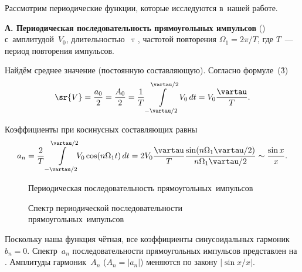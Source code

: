 Рассмотрим периодические функции, которые исследуются в~нашей работе.

{\bf А. Периодическая последовательность прямоугольных импульсов} () с~амплитудой~$V_0$, длительностью~$\uptau$, частотой повторения $\Omega_1=2\pi/T$, где $T$~--- период повторения импульсов.

Найдём среднее значение (постоянную составляющую). Согласно формуле~(\r3)
\begin{equation}
	\sr{V}=\frac{a_0}{2}=\frac{A_0}{2}= \frac1T\int\limits_{-\vartau/2}^{\vartau/2}\!V_0\,dt= V_0\frac{\vartau}{T}.
\end{equation}

Коэффициенты при косинусных составляющих равны
\begin{equation}
	a_n=\frac2T\int\limits_{-\vartau/2}^{\vartau/2}\!\!\!V_0 \cos(n\Omega_1t)\,dt=2V_0\frac{\vartau}{T}
\frac{\sin(n\Omega_1\vartau/2)}{n\Omega_1\vartau/2} \sim\frac{\sin x}{x}.
\end{equation}



\begin{figure}
\left
\begin{minipage}{0.45\textwidth}
	\left
	\caption{Периодическая последовательность прямоугольных~импульсов}
\end{minipage}
\right
\begin{minipage}{0.45\textwidth}
	\left
	\caption{Спектр периодической последовательности прямоугольных~импульсов}
\end{minipage}
\end{figure}

Поскольку наша функция чётная, все коэффициенты синусоидальных гармоник $b_n=0$. Спектр~$a_n$ последовательности прямоугольных импульсов представлен на . Амплитуды гармоник~$A_n$ ($A_n=|a_n|$) меняются по закону $|\sin x/x|$.

